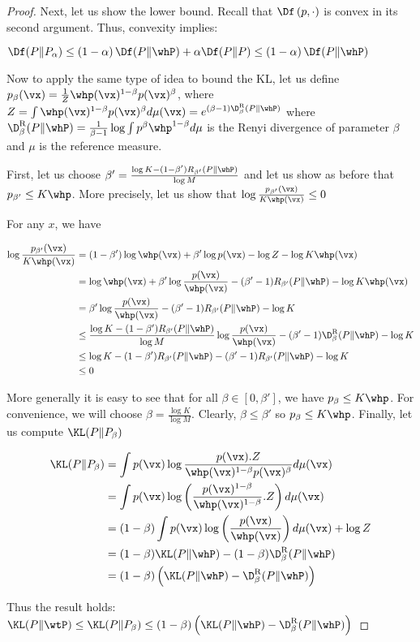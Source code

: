 \documentclass[twoside]{article}
\begin{document}
\begin{proof}
Next, let us show the lower bound. Recall that $\Df\left(p,\cdot\right)$
is convex in its second argument. Thus, convexity implies:

$\Df(P\Vert P_{\alpha})\le\left(1-\alpha\right)\Df(P\Vert\whP)+\alpha\Df(P\Vert P)\le\left(1-\alpha\right)\Df(P\Vert\whP)$

Now to apply the same type of idea to bound the KL, let us define
$p_{\beta}(\vx)=\frac{1}{Z}\whp(\vx)^{1-\beta}p(\vx)^{\beta}$, where $Z=\int\whp(\vx)^{1-\beta}p(\vx)^{\beta}d\mu(\vx)=e^{(\beta-1)\D^\mathrm{R}_{\beta}(P\Vert\whP)}$
where $\D^\mathrm{R}_{\beta}(P\Vert\whP)=\frac{1}{\beta-1}\log\int p^{\beta}\whp^{1-\beta}d\mu$
is the Renyi divergence of parameter $\beta$ and $\mu$ is the reference
measure.

First, let us choose $\beta'=\frac{\log K-(1-\beta')R_{\beta'}(P\Vert\whP)}{\log M}$
and let us show as before that $p_{\beta'}\le K\whp$. More precisely,
let us show that $\log\frac{p_{\beta'}(\vx)}{K\whp(\vx)}\le0$

For any $x$, we have

\begin{align*}
\log\frac{p_{\beta'}(\vx)}{K\whp(\vx)} & =(1-\beta')\log\whp(\vx)+\beta'\log p(\vx)-\log Z-\log K\whp(\vx)\\
 & =\log\whp(\vx)+\beta'\log\frac{p(\vx)}{\whp(\vx)}-(\beta'-1)R_{\beta'}(P\Vert\whP)-\log K\whp(\vx)\\
 & =\beta'\log\frac{p(\vx)}{\whp(\vx)}-(\beta'-1)R_{\beta'}(P\Vert\whP)-\log K\\
 & \le\frac{\log K-(1-\beta')R_{\beta'}(P\Vert\whP)}{\log M}\log\frac{p(\vx)}{\whp(\vx)}-(\beta'-1)\D^\mathrm{R}_{\beta}(P\Vert\whP)-\log K\\
 & \le\log K-(1-\beta')R_{\beta'}(P\Vert\whP)-(\beta'-1)R_{\beta'}(P\Vert\whP)-\log K\\
 & \le0
\end{align*}

More generally it is easy to see that for all $\beta\in[0,\beta']$, we have $p_{\beta}\le K\whp$. For convenience, we will choose $\beta=\frac{\log K}{\log M}$. Clearly, $\beta\le\beta'$ so $p_{\beta}\le K\whp$.
Finally, let us compute $\KL(P\Vert P_{\beta})$

\begin{align*}
\KL(P\Vert P_{\beta}) & =\int p(\vx)\log\frac{p(\vx).Z}{\whp(\vx)^{1-\beta}p(\vx)^{\beta}}d\mu(\vx)\\
 & =\int p(\vx)\log\left(\frac{p(\vx)^{1-\beta}}{\whp(\vx)^{1-\beta}}.Z\right)d\mu(\vx)\\
 & =(1-\beta)\int p(\vx)\log\left(\frac{p(\vx)}{\whp(\vx)}\right)d\mu(\vx)+\log Z\\
 & =(1-\beta)\KL(P\Vert\whP)-(1-\beta)\D^\mathrm{R}_{\beta}(P\Vert\whP)\\
 & =(1-\beta)\left(\KL(P\Vert\whP)-\D^\mathrm{R}_{\beta}(P\Vert\whP)\right)
\end{align*}

Thus the result holds: $\KL(P\Vert\wtP)\le \KL(P\Vert P_{\beta})\le(1-\beta)\left(\KL(P\Vert\whP)-\D^\mathrm{R}_{\beta}(P\Vert\whP)\right)$
\end{proof}
\end{document}
